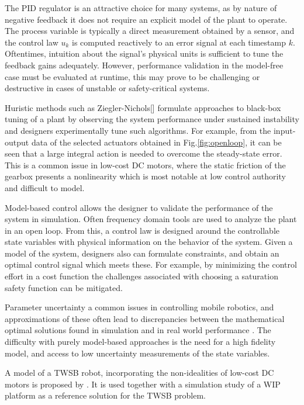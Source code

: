         The PID regulator is an attractive choice for many systems, as by nature of negative feedback it does not 
        require an explicit model of the plant to operate. The process variable is typically a direct measurement 
        obtained by a sensor, and the control law $u_k$ is computed reactively to an error signal at each timestamp $k$.
        Oftentimes, intuition about the signal's physical units is sufficient to tune the feedback gains adequately. 
        However, performance validation in the model-free case must be evaluated at runtime, this may prove to be 
        challenging or destructive in cases of unstable or safety-critical systems. 
        
        Huristic methods such as Ziegler-Nichols[]
        formulate approaches to black-box tuning of a plant by observing the system 
        performance under sustained instability and designers experimentally tune such algorithms.
        For example, from the input-output data of the selected actuators obtained in Fig.\ref{fig:openloop}, 
        it can be seen that a large integral action is needed to overcome the steady-state error.
        This is a common issue in low-cost DC motors, where the static friction of the gearbox presents 
        a nonlinearity which is most notable at low control authority and difficult to model. 
    
        Model-based control allows the designer to validate the performance of the system in simulation. 
        Often frequency domain tools are used to analyze the plant in an open loop. From this, a control law is designed around 
        the controllable state variables with physical information on the behavior of the system.
        Given a model of the system, designers also can formulate constraints, 
        and obtain an optimal control signal which meets these. For example, by minimizing the control effort in a cost function
        the challenges associated with choosing a saturation safety function can be mitigated.
    
        Parameter uncertainty a common issues in controlling mobile robotics, and approximations of these often lead to 
        discrepancies between the mathematical optimal solutions found in simulation \cite{eide2011lqg} 
        and in real world performance \cite{tran2023fuzzy}. The difficulty with purely model-based approaches is
        the need for a high fidelity model, and access to low uncertainty measurements of the state variables.
    
        A model of a TWSB robot, incorporating the non-idealities of low-cost DC motors is proposed by \cite{yamamoto2008nxtway}.
        It is used together with a simulation study of a WIP platform as a reference solution for the TWSB problem.

